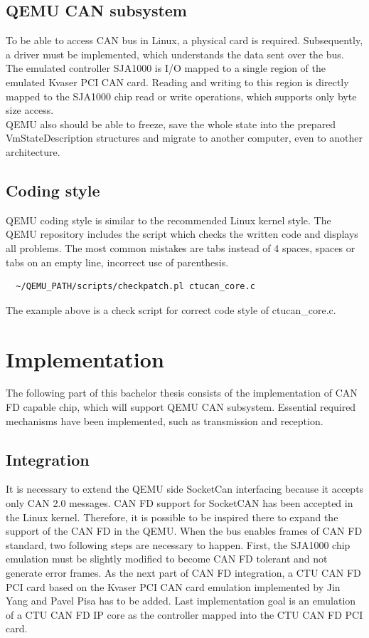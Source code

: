 \documentclass{ctuthesis}
\begin{document}
 \section{QEMU CAN subsystem}
  To be able to access CAN bus in Linux, a physical card is required. Subsequently, a driver must be implemented, which understands the data sent over the bus. \\
  The emulated controller SJA1000 is I/O mapped to a single region of the emulated Kvaser PCI CAN card. Reading and writing to this region is directly mapped to the SJA1000 chip read or write operations, which supports only byte size access. \\
  QEMU also should be able to freeze, save the whole state into the prepared VmStateDescription structures and migrate to another computer, even to another architecture. \\

 \section{Coding style}
  QEMU coding style \cite{qemu-style} is similar to the recommended Linux kernel style.  The QEMU repository includes the script which checks the written code and displays all problems. The most common mistakes are tabs instead of 4 spaces, spaces or tabs on an empty line, incorrect use of parenthesis.
  \begin{verbatim}  ~/QEMU_PATH/scripts/checkpatch.pl ctucan_core.c\end{verbatim}
  The example above is a check script for correct code style of ctucan\_core.c.

 
\chapter{Implementation}
 The following part of this bachelor thesis consists of the implementation of CAN FD capable chip, which will support QEMU CAN subsystem. Essential required mechanisms have been implemented, such as transmission and reception.  
 \section{Integration}
  It is necessary to extend the QEMU side SocketCan interfacing because it accepts only CAN 2.0 messages. CAN FD support for SocketCAN has been accepted in the Linux kernel. Therefore, it is possible to be inspired there to expand the support of the CAN FD in the QEMU. When the bus enables frames of CAN FD standard, two following steps are necessary to happen. First, the SJA1000 chip emulation must be slightly modified to become CAN FD tolerant and not generate error frames. As the next part of CAN FD integration, a CTU CAN FD PCI card based on the Kvaser PCI CAN card emulation implemented by Jin Yang and Pavel Pisa has to be added. Last implementation goal is an emulation of a CTU CAN FD IP core as the controller mapped into the CTU CAN FD PCI card.
  
\end{document}
